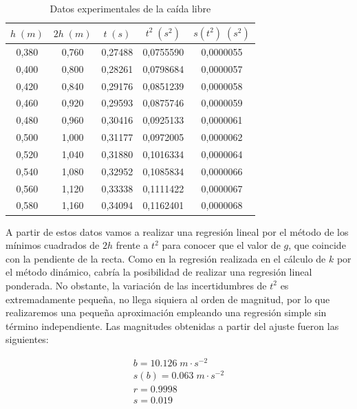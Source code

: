 \documentclass[a4paper,12pt,titlepage]{article}
\begin{document}
\begin{table}[h!]
    \centering
    \begin{tabular}{|c|c|c|c|c|}
    \hline
    $h \; (m)$ & $2h \; (m)$ & $t \; (s)$ & $t^2 \; (s^2)$ & $s(t^2) \; (s^2)$ \\ \hline
    0,380 & 0,760 & 0,27488 & 0,0755590 & 0,0000055 \\ \hline
    0,400  & 0,800  & 0,28261 & 0,0798684 & 0,0000057 \\ \hline
    0,420 & 0,840 & 0,29176 & 0,0851239 & 0,0000058 \\ \hline
    0,460 & 0,920 & 0,29593 & 0,0875746 & 0,0000059 \\ \hline
    0,480 & 0,960 & 0,30416 & 0,0925133 & 0,0000061 \\ \hline
    0,500  & 1,000    & 0,31177 & 0,0972005 & 0,0000062 \\ \hline
    0,520 & 1,040 & 0,31880  & 0,1016334  & 0,0000064 \\ \hline
    0,540 & 1,080 & 0,32952 & 0,1085834  & 0,0000066 \\ \hline
    0,560 & 1,120 & 0,33338 & 0,1111422 & 0,0000067 \\ \hline
    0,580 & 1,160 & 0,34094 & 0,1162401 & 0,0000068 \\ \hline
    \end{tabular}
    \caption{Datos experimentales de la caída libre}
    \label{Datos gravedad}
\end{table}

A partir de estos datos vamos a realizar una regresión lineal por el método de los mínimos cuadrados de $2h$ frente a $t^2$ para conocer que el valor de $g$, que coincide con la pendiente de la recta. Como en la regresión realizada en el cálculo de $k$ por el método dinámico, cabría la posibilidad de realizar una regresión lineal ponderada. No obstante, la variación de las incertidumbres de $t^2$ es extremadamente pequeña, no llega siquiera al orden de magnitud, por lo que realizaremos una pequeña aproximación empleando una regresión simple sin término independiente. Las magnitudes obtenidas a partir del ajuste fueron las siguientes:

\begin{equation}
    \begin{gathered}
        b =  10.126 \; m \cdot s^{-2} \\
        s(b) = 0.063 \; m \cdot s^{-2} \\
        r =  0.9998 \\
        s =  0.019
    \end{gathered}
\end{equation}
\end{document}
